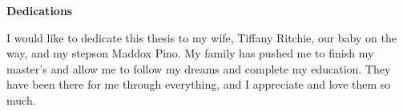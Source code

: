 
\begin{center}
\textbf{Dedications}
\end{center}

I would like to dedicate this thesis to my wife, Tiffany Ritchie, our baby on the way, and my stepson Maddox Pino. My family has pushed me to finish my master’s and allow me to follow my dreams and complete my education. They have been there for me through everything, and I appreciate and love them so much.

\newpage